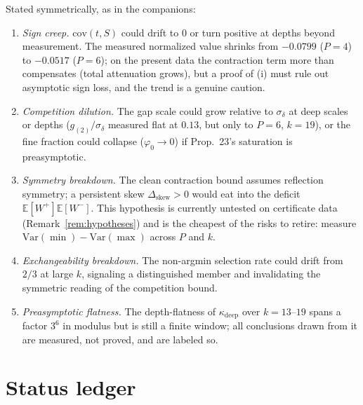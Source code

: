 \documentclass[11pt]{article}
\theoremstyle{definition}
\theoremstyle{remark}
\newcommand{\E}{\mathbb{E}}
\newcommand{\Var}{\mathrm{Var}}
\newcommand{\cov}{\mathrm{cov}}
\newcommand{\kap}{\kappa}
\newcommand{\dl}{\delta}
\begin{document}
Stated symmetrically, as in the companions:
\begin{enumerate}
\item \emph{Sign creep.} $\cov(t,S)$ could drift to $0$ or turn positive
at depths beyond measurement. The measured normalized value shrinks from
$-0.0799$ ($P{=}4$) to $-0.0517$ ($P{=}6$); on the present data the
contraction term more than compensates (total attenuation grows), but a
proof of (i) must rule out asymptotic sign loss, and the trend is a
genuine caution.
\item \emph{Competition dilution.} The gap scale could grow relative to
$\sigma_\dl$ at deep scales or depths ($g_{(2)}/\sigma_\dl$ measured
flat at $0.13$, but only to $P = 6$, $k = 19$), or the fine fraction
could collapse ($\varphi_0 \to 0$) if Prop.~23's saturation is
preasymptotic.
\item \emph{Symmetry breakdown.} The clean contraction bound assumes
reflection symmetry; a persistent skew $\Delta_{\mathrm{skew}} > 0$
would eat into the deficit $\E[W^+]\E[W^-]$. This hypothesis is
currently untested on certificate data (Remark~\ref{rem:hypotheses}) and
is the cheapest of the risks to retire: measure
$\Var(\min) - \Var(\max)$ across $P$ and $k$.
\item \emph{Exchangeability breakdown.} The non-argmin selection rate
could drift from $2/3$ at large $k$, signaling a distinguished member
and invalidating the symmetric reading of the competition bound.
\item \emph{Preasymptotic flatness.} The depth-flatness of
$\kap_{\mathrm{deep}}$ over $k = 13$--$19$ spans a factor $3^6$ in
modulus but is still a finite window; all conclusions drawn from it are
measured, not proved, and are labeled so.
\end{enumerate}

\section{Status ledger}
\label{sec:status}
\end{document}

